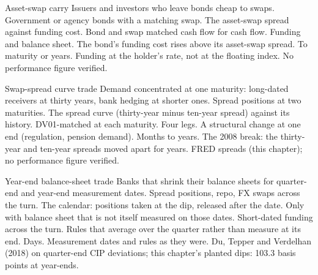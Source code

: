\begin{strategyfile}{Asset-swap carry}\label{strat:s2:swap-spread-and-asset-swap-trades:assetswap}
 Issuers and investors who leave bonds cheap to swaps.
 Government or agency bonds with a matching swap.
 The asset-swap spread against funding cost.
 Bond and swap matched cash flow for cash flow.
 Funding and balance sheet.
 The bond's funding cost rises above its asset-swap spread.
 To maturity or years.
 Funding at the holder's rate, not at the floating index.
 No performance figure verified.
\end{strategyfile}

\begin{strategyfile}{Swap-spread curve trade}\label{strat:s2:swap-spread-and-asset-swap-trades:curve}
 Demand concentrated at one maturity: long-dated receivers at thirty years, bank hedging at shorter ones.
 Spread positions at two maturities.
 The spread curve (thirty-year minus ten-year spread) against its history.
 DV01-matched at each maturity.
 Four legs.
 A structural change at one end (regulation, pension demand).
 Months to years.
 The 2008 break: the thirty-year and ten-year spreads moved apart for years.
 FRED spreads (this chapter); no performance figure verified.
\end{strategyfile}

\begin{strategyfile}{Year-end balance-sheet trade}\label{strat:s2:swap-spread-and-asset-swap-trades:yearend}
 Banks that shrink their balance sheets for quarter-end and year-end measurement dates.
 Spread positions, repo, FX swaps across the turn.
 The calendar: positions taken at the dip, released after the date.
 Only with balance sheet that is not itself measured on those dates.
 Short-dated funding across the turn.
 Rules that average over the quarter rather than measure at its end.
 Days.
 Measurement dates and rules as they were.
 Du, Tepper and Verdelhan (2018) on quarter-end CIP deviations; this chapter's planted dips: 103.3 basis points at year-ends.
\end{strategyfile}

